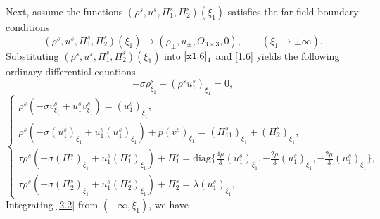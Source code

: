 \documentclass[10pt,reqno]{amsart}
\numberwithin{equation}{section}
\begin{document}
Next, assume the functions $(\rho^s, u^s, \Pi_1^s, \Pi_2^s)(\xi_1)$ satisfies the far-field boundary conditions
\begin{equation}\label{2.1}
(\rho^s, u^s, \Pi_1^s, \Pi_2^s)(\xi_1)\rightarrow (\rho_\pm, u_\pm, O_{3\times3}, 0),\qquad (\xi_1\rightarrow\pm\infty).
\end{equation}
 Substituting $(\rho^s, u^s, \Pi_1^s, \Pi_2^s)(\xi_1)$ into $\eqref{x1.6}_1$ and \eqref{1.6} yields the following ordinary differential equations
\begin{equation}\label{2.2}
-\sigma\rho^s_{\xi_1}+(\rho^s u_1^s)_{\xi_1}=0,
\end{equation}
\begin{equation}\label{2.3}
\begin{cases}
\rho^s\left(-\sigma v^s_{\xi_1}+ u_1^sv^s_{\xi_1}\right)=(u_1^s)_{\xi_1},\\
\rho^s\left(-\sigma( u_1^s)_{\xi_1}+u_1^s(u_1^s)_{\xi_1}\right)+p(v^s)_{\xi_1}=
                            (\Pi_{11}^s)_{\xi_1}+(\Pi_2^s)_{\xi_1},\\
\tau \rho^s \left(-\sigma(\Pi^s_{1})_{\xi_1}+ u_1^s(\Pi^s_{1})_{\xi_1}\right)+\Pi^s_{1}=
                          \text{diag}\{ \frac{4\mu}{3}(u_1^s)_{\xi_1}, -\frac{2\mu}{3}(u_1^s)_{\xi_1}, -\frac{2\mu}{3}(u_1^s)_{\xi_1}\},\\
\tau \rho^s \left(-\sigma(\Pi_2^s)_{\xi_1}+ u_1^s(\Pi^s_2)_{\xi_1}\right)+\Pi^s_2=\lambda(u_1^s)_{\xi_1},
\end{cases}
\end{equation}
 Integrating \eqref{2.2} from $(-\infty, \xi_1)$, we have
\end{document}
